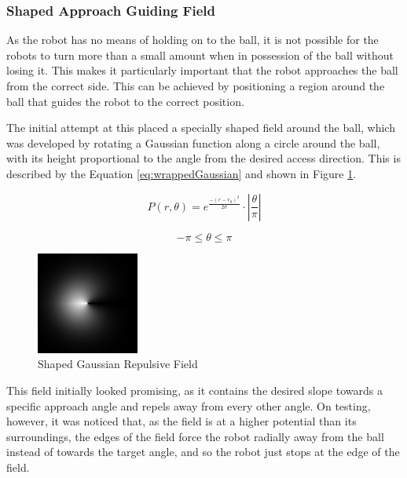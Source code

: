 \documentclass[10pt]{article}
\begin{document}
\subsubsection{Shaped Approach Guiding Field\label{sub:Shaped-Approach-Guiding}}

As the robot has no means of holding on to the ball, it is not possible for the
robots to turn more than a small amount when in possession of the ball without
losing it. This makes it particularly important that the robot approaches the
ball from the correct side. This can be achieved by positioning a region around
the ball that guides the robot to the correct position.

The initial attempt at this placed a specially shaped field around the ball,
which was developed by rotating a Gaussian function along a circle around the
ball, with its height proportional to the angle from the desired access
direction. This is described by the Equation \ref{eq:wrappedGaussian} and shown
in Figure \ref{fig:wrappedGaussianField}.

\begin{equation}
P\left(r,\theta\right)=e^{\frac{-\left(r-r_{0}\right)^{2}}{2\sigma}}\cdot\left|\frac{\theta}{\pi}\right|\label{eq:wrappedGaussian}
\end{equation}

\[
-\pi\leq\theta\leq\pi
\]

\begin{figure}
 \centering
 \includegraphics[width=0.3\textwidth]{Images/wrapped-field}
 \caption{Shaped Gaussian Repulsive Field}
 \label{fig:wrappedGaussianField}
\end{figure}

This field initially looked promising, as it contains the desired slope towards
a specific approach angle and repels away from every other angle. On testing,
however, it was noticed that, as the field is at a higher potential than its
surroundings, the edges of the field force the robot radially away from the ball
instead of towards the target angle, and so the robot just stops at the edge of
the field.
\end{document}
